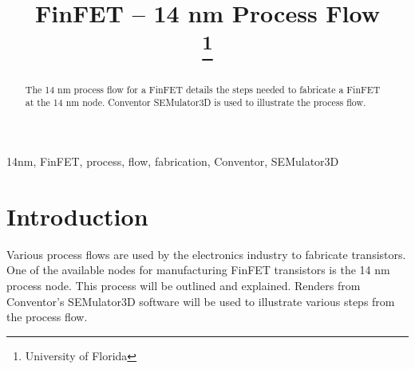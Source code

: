 \documentclass[conference]{IEEEtran}
\begin{document}
\title{FinFET -- 14 nm Process Flow\\
\thanks{University of Florida}
}

\author{
    \and
    \and
    \and
}

\maketitle

\begin{abstract}
The 14 nm process flow for a FinFET details the steps needed to fabricate a
FinFET at the 14 nm node. Conventor SEMulator3D is used to illustrate the
process flow.
\end{abstract}

\begin{IEEEkeywords}
14nm, FinFET, process, flow, fabrication, Conventor, SEMulator3D
\end{IEEEkeywords}

\section{Introduction}
Various process flows are used by the electronics industry to fabricate
transistors. One of the available nodes for manufacturing FinFET transistors is
the 14 nm process node. This process will be outlined and explained.
Renders from Conventor's SEMulator3D software will be used to illustrate
various steps from the process flow.
\end{document}
